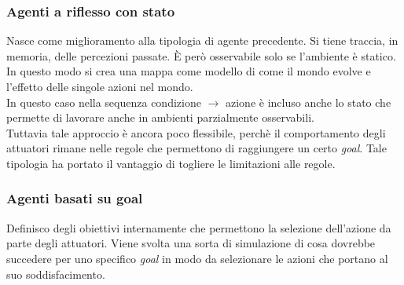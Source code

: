 \documentclass[10pt,a4paper]{book}
\begin{document}
\subsubsection{Agenti a riflesso con stato}
Nasce come miglioramento alla tipologia di agente precedente. Si tiene traccia, in memoria, delle percezioni passate. \`E per\`o osservabile solo se l'ambiente \`e statico. In questo modo si crea una mappa come modello di come il mondo evolve e l'effetto delle singole azioni nel mondo.\\
In questo caso nella sequenza condizione $\rightarrow$ azione \`e incluso anche lo stato che permette di lavorare anche in ambienti parzialmente osservabili.\\
Tuttavia tale approccio \`e ancora poco flessibile, perch\`e il comportamento degli attuatori rimane nelle regole che permettono di raggiungere un certo \textit{goal}. Tale tipologia ha portato il vantaggio di togliere le limitazioni alle regole.
\subsubsection{Agenti basati su goal}
Definisco degli obiettivi internamente che permettono la selezione dell'azione da parte degli attuatori. Viene svolta una sorta di simulazione di cosa dovrebbe succedere per uno specifico \textit{goal} in modo da selezionare le azioni che portano al suo soddisfacimento.
\end{document}
